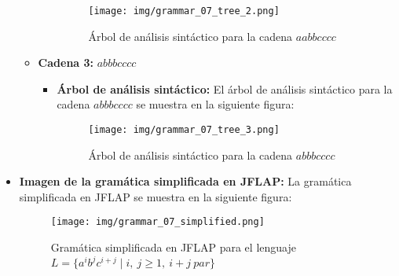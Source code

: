 \documentclass[11pt]{report}
\begin{document}
\begin{itemize}
\begin{itemize}
\begin{itemize}
      \begin{figure}[H]
        \centering
        \texttt{[image: img/grammar\_07\_tree\_2.png]}
        \caption{Árbol de análisis sintáctico para la cadena $aabbcccc$}
        \label{fig:arbol20}
      \end{figure}
    \end{itemize}
    \item \textbf{Cadena 3:} $abbbcccc$
    \begin{itemize}
      \item \textbf{Árbol de análisis sintáctico:} El árbol de análisis sintáctico para la cadena $abbbcccc$ se muestra en la siguiente figura:
      \begin{figure}[H]
        \centering
        \texttt{[image: img/grammar\_07\_tree\_3.png]}
        \caption{Árbol de análisis sintáctico para la cadena $abbbcccc$}
        \label{fig:arbol21}
      \end{figure}
    \end{itemize}
  \end{itemize}
  \item \textbf{Imagen de la gramática simplificada en JFLAP:} La gramática simplificada en JFLAP se muestra en la siguiente figura:
  \begin{figure}[H]
    \centering
    \texttt{[image: img/grammar\_07\_simplified.png]}
    \caption{Gramática simplificada en JFLAP para el lenguaje $L = \{a^i b^j c^{i+j} \mid i, \ j \geq 1, \ i + j \ par\}$}
    \label{fig:gramatica7_simplified}
  \end{figure}
\end{itemize}

\newpage

\end{document}
